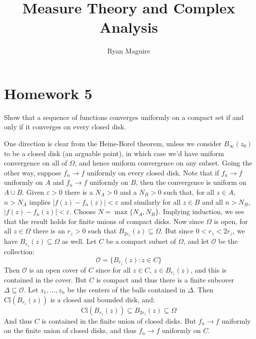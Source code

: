 \documentclass[crop=false,class=article]{standalone}                           %
\begin{document}
    \title{Measure Theory and Complex Analysis}
    \author{Ryan Maguire}
    \date{\vspace{-5ex}}
    \maketitle
    \vspace{10ex}
    \setcounter{section}{1}
    \section*{Homework 5}
    \begin{problem}
        Show that a sequence of functions converges uniformly on a compact set
        if and only if it converges on every closed disk.
    \end{problem}
    \begin{solution}
        One direction is clear from the Heine-Borel theorem, unless we consider
        $B_{\infty}(z_{0})$ to be a closed disk (an arguable point), in which
        case we'd have uniform convergence on all of $\Omega$, and hence
        uniform convergence on any subset. Going the other way, suppose
        $f_{n}\rightarrow{f}$ uniformly on every closed disk. Note that if
        $f_{n}\rightarrow{f}$ uniformly on $A$ and $f_{n}\rightarrow{f}$
        uniformly on $B$, then the convergence is uniform on $A\cup{B}$.
        Given $\varepsilon>0$ there is a $N_{A}>0$ and a $N_{B}>0$
        such that, for all $z\in{A}$, $n>N_{A}$ implies
        $|f(z)-f_{n}(z)|<\varepsilon$ and similarly for all $z\in{B}$ and all
        $n>N_{B}$, $|f(z)-f_{n}(z)|<\varepsilon$. Choose
        $N=\max\{N_{A},N_{B}\}$. Implying induction, we see that the result
        holds for finite unions of compact disks. Now since $\Omega$ is open,
        for all $z\in\Omega$ there is an $r_{z}>0$ such that
        $B_{2r_{z}}(z)\subseteq\Omega$. But since $0<r_{z}<2r_{z}$, we have
        $B_{r_{z}}(z)\subseteq\Omega$ as well. Let $C$ be a compact subset of
        $\Omega$, and let $\mathcal{O}$ be the collection:
        \begin{equation}
            \mathcal{O}=\{B_{r_{z}}(z):z\in{C}\}
        \end{equation}
        Then $\mathcal{O}$ is an open cover of $C$ since for all $z\in{C}$,
        $z\in{B}_{r_{z}}(z)$, and this is contained in the cover. But $C$ is
        compact and thus there is a finite subcover
        $\Delta\subseteq\mathcal{O}$. Let $z_{1},\dots,z_{n}$ be the centers of
        the balls contained in $\Delta$. Then $\textrm{Cl}(B_{r_{z}}(z))$ is a
        closed and bounded disk, and:
        \begin{equation}
            \textrm{Cl}(B_{r_{z}}(z))\subseteq{B}_{2r_{z}}(z)\subseteq\Omega
        \end{equation}
        And thus $C$ is contained in the finite union of closed disks. But
        $f_{n}\rightarrow{f}$ uniformly on the finite union of closed disks, and
        thus $f_{n}\rightarrow{f}$ uniformly on $C$.
    \end{solution}
\end{document}
